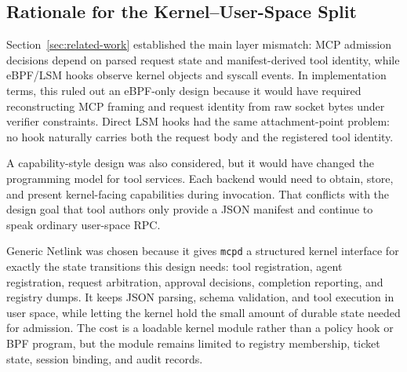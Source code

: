 \subsection{Rationale for the Kernel--User-Space Split}
\label{sec:design-alternatives}

Section~\ref{sec:related-work} established the main layer mismatch: MCP admission decisions depend on parsed request state and manifest-derived tool identity, while eBPF/LSM hooks observe kernel objects and syscall events.
In implementation terms, this ruled out an eBPF-only design because it would have required reconstructing MCP framing and request identity from raw socket bytes under verifier constraints.
Direct LSM hooks had the same attachment-point problem: no hook naturally carries both the request body and the registered tool identity.

A capability-style design was also considered, but it would have changed the programming model for tool services.
Each backend would need to obtain, store, and present kernel-facing capabilities during invocation.
That conflicts with the design goal that tool authors only provide a JSON manifest and continue to speak ordinary user-space RPC.

Generic Netlink was chosen because it gives \texttt{mcpd} a structured kernel interface for exactly the state transitions this design needs: tool registration, agent registration, request arbitration, approval decisions, completion reporting, and registry dumps.
It keeps JSON parsing, schema validation, and tool execution in user space, while letting the kernel hold the small amount of durable state needed for admission.
The cost is a loadable kernel module rather than a policy hook or BPF program, but the module remains limited to registry membership, ticket state, session binding, and audit records.

